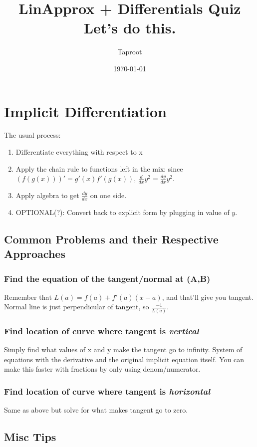\documentclass[letterpaper]{article}
\author{Taproot}
\date{\today}
\title{LinApprox + Differentials Quiz\\\medskip
\large Let's do this.}
\renewcommand\maketitle{}
\begin{document}
\maketitle

\section{Implicit Differentiation}
\label{sec:org17f0382}
The usual process:
\begin{enumerate}
\item Differentiate everything with respect to x
\item Apply the chain rule to functions left in the mix: since \((f(g(x)))' = g'(x) f'(g(x))\), \(\frac{d}{dx}y^2 =  \frac{dy}{dx}y^2\).
\item Apply algebra to get \(\frac{dy}{dx}\) on one side.
\item OPTIONAL(?): Convert back to explicit form by plugging in value of \(y\).
\end{enumerate}

\subsection{Common Problems and their Respective Approaches}
\label{sec:org11cfbfc}
\subsubsection{Find the equation of the tangent/normal at (A,B)}
\label{sec:orgd61ed91}
Remember that \(L(a) = f(a) + f'(a)(x-a)\), and that'll give you tangent.
Normal line is just perpendicular of tangent, so \(\frac{-1}{L(a)}\).
\subsubsection{Find location of curve where tangent is \emph{vertical}}
\label{sec:org25c37ed}
Simply find what values of x and y make the tangent go to infinity.
System of equations with the derivative and the original implicit equation itself. You can make this faster with fractions by only using denom/numerator.
\subsubsection{Find location of curve where tangent is \emph{horizontal}}
\label{sec:org5ffcd6c}
Same as above but solve for what makes tangent go to zero.
\subsection{Misc Tips}
\label{sec:orgcb2bcd5}
\end{document}
